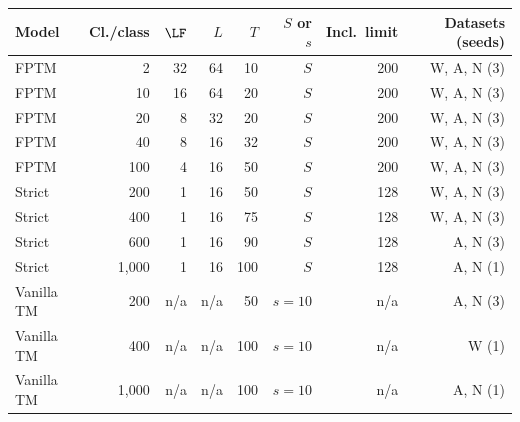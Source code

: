 \begin{tabular}{lrrrrrrr}
\toprule
Model & Cl./class & $\LF$ & $L$ & $T$ & $S$ or $s$ & Incl.\ limit & Datasets (seeds) \\
\midrule
FPTM & 2 & 32 & 64 & 10 & $S$ & 200 & W, A, N (3) \\
FPTM & 10 & 16 & 64 & 20 & $S$ & 200 & W, A, N (3) \\
FPTM & 20 & 8 & 32 & 20 & $S$ & 200 & W, A, N (3) \\
FPTM & 40 & 8 & 16 & 32 & $S$ & 200 & W, A, N (3) \\
FPTM & 100 & 4 & 16 & 50 & $S$ & 200 & W, A, N (3) \\
Strict & 200 & 1 & 16 & 50 & $S$ & 128 & W, A, N (3) \\
Strict & 400 & 1 & 16 & 75 & $S$ & 128 & W, A, N (3) \\
Strict & 600 & 1 & 16 & 90 & $S$ & 128 & A, N (3) \\
Strict & 1,000 & 1 & 16 & 100 & $S$ & 128 & A, N (1) \\
Vanilla TM & 200 & n/a & n/a & 50 & $s=10$ & n/a & A, N (3) \\
Vanilla TM & 400 & n/a & n/a & 100 & $s=10$ & n/a & W (1) \\
Vanilla TM & 1,000 & n/a & n/a & 100 & $s=10$ & n/a & A, N (1) \\
\bottomrule
\end{tabular}
